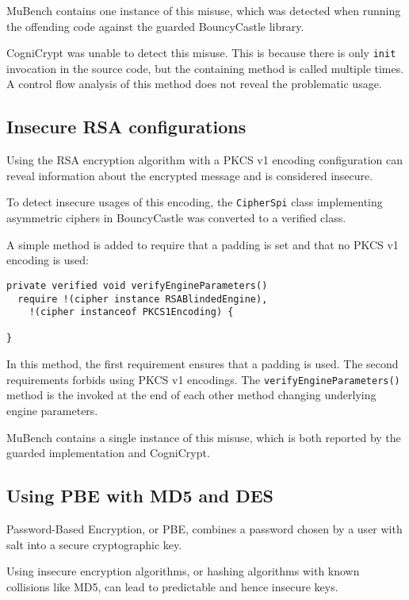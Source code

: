 \documentclass{article}
\begin{document}
MuBench contains one instance of this misuse, which was detected when running the offending
code against the guarded BouncyCastle library.

CogniCrypt was unable to detect this misuse. This is because there is only \texttt{init}
invocation in the source code, but the containing method is called multiple times.
A control flow analysis of this method does not reveal the problematic usage.

\subsection{Insecure RSA configurations}

Using the RSA encryption algorithm with a PKCS v1 encoding configuration can reveal
information about the encrypted message and is considered insecure.

To detect insecure usages of this encoding, the \texttt{CipherSpi} class implementing
asymmetric ciphers in BouncyCastle was converted to a verified class.

A simple method is added to require that a padding is set and that no
PKCS v1 encoding is used:

\begin{lstlisting}[style=jGuard]
private verified void verifyEngineParameters() 
  require !(cipher instance RSABlindedEngine),
    !(cipher instanceof PKCS1Encoding) {

}
\end{lstlisting}

In this method, the first requirement ensures that a padding is used.
The second requirements forbids using PKCS v1 encodings.
The \texttt{verifyEngineParameters()} method is the invoked at the end of each
other method changing underlying engine parameters.

MuBench contains a single instance of this misuse, which is both reported by
the guarded implementation and CogniCrypt.

\subsection{Using PBE with MD5 and DES}

Password-Based Encryption, or PBE, combines a password chosen by a user
with salt into a secure cryptographic key.

Using insecure encryption algorithms, or hashing algorithms with known collisions like MD5,
can lead to predictable and hence insecure keys.
\end{document}
